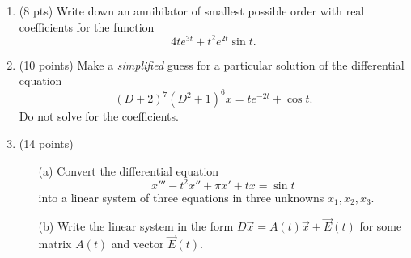 \documentclass[12pt]{article}
\newcommand{\bE}{\vec{E}}
\newcommand{\bx}{\vec{x}}
\begin{document}
\begin{enumerate}
\item (8 pts) Write down an annihilator of smallest
      possible order with real coefficients for the function
      \[
        4 t e^{3t}+ t^2 e^{2t} \sin t.
      \]


\newpage
      
\item  (10 points) Make a \textit{simplified} guess for a particular solution of
    the differential equation
    \[
      (D+2)^7 (D^2+1)^6 x = t e^{-2t} + \cos t.
    \]
    Do not solve for the coefficients.



\newpage


      \item (14 points)
        \begin{enumerate}
          \item[(a)] Convert the differential equation
        \[
          x''' - t^2 x'' + \pi x' + t x = \sin t
        \]
        into a linear system of three equations in three unknowns
        $x_1, x_2, x_3$.
        \item[(b)] Write the linear system in the form $D\bx = A(t)
          \bx + \bE(t)$ for some matrix $A(t)$ and vector $\bE(t)$.
        \end{enumerate}



        \newpage

%


\end{enumerate}
\end{document}
